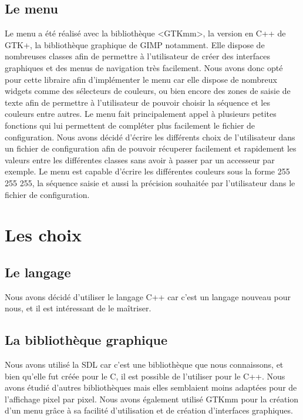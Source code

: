 \documentclass{article}
\begin{document}
	\subsection{Le menu}
	Le menu a été réalisé avec la bibliothèque <GTKmm>, la version en C++ de GTK+, la bibliothèque graphique de GIMP notamment.
	Elle dispose de nombreuses classes afin de permettre à l'utilisateur de créer des interfaces graphiques et des menus de navigation très facilement.
	Nous avons donc opté pour cette libraire afin d'implémenter le menu car elle dispose de nombreux widgets comme des sélecteurs de couleurs, ou bien encore des zones de saisie de texte afin de permettre à l'utilisateur de pouvoir choisir la séquence et les couleurs entre autres.
	Le menu fait principalement appel à plusieurs petites fonctions qui lui permettent de compléter plus facilement le fichier de configuration.
	Nous avons décidé d'écrire les différents choix de l'utilisateur dans un fichier de configuration afin de pouvoir récuperer facilement et rapidement les valeurs entre les différentes classes sans avoir à passer par un accesseur par exemple.
	Le menu est capable d'écrire les différentes couleurs sous la forme 255 255 255, la séquence saisie et aussi la précision souhaitée par l'utilisateur dans le fichier de configuration.

	\section{Les choix}

	\subsection{Le langage}

	Nous avons décidé d'utiliser le langage C++ car c'est un langage nouveau pour nous, et il est intéressant de le maîtriser.

	\subsection{La bibliothèque graphique}

	Nous avons utilisé la SDL car c'est une bibliothèque que nous connaissons, et bien qu'elle fut créée pour le C, il est possible de l'utiliser pour le C++.
	Nous avons étudié d'autres bibliothèques mais elles semblaient moins adaptées pour de l'affichage pixel par pixel.
	Nous avons également utilisé GTKmm pour la création d'un menu grâce à sa facilité d'utilisation et de création d'interfaces graphiques.
\end{document}
